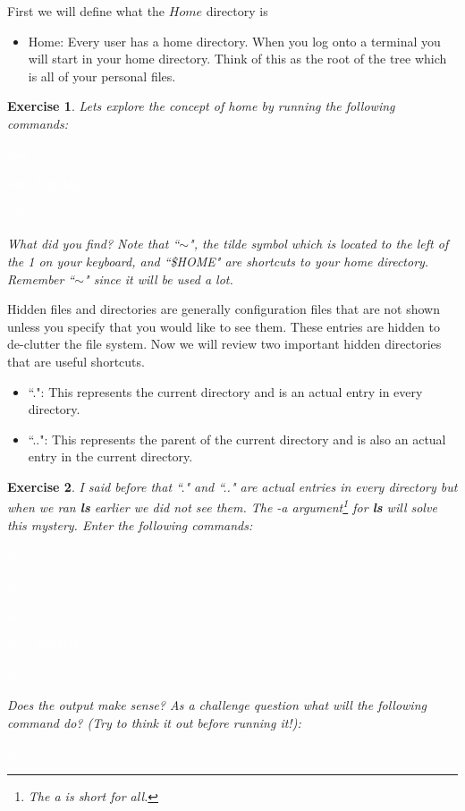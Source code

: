 \documentclass[oneside]{book}
\newcommand{\commandline}[1]{\begin{center} \colorbox{Dark}{\textcolor{white}{#1}} \end{center}}
\newtheorem{ex}{Exercise}[chapter]
\begin{document}
First we will define what the $Home$ directory is
\begin{itemize}
	\item Home: Every user has a home directory. When you log onto a terminal you will start in your home directory. Think of this as the root of the tree which is all of your personal files.
\end{itemize}

\begin{ex} 
	Lets explore the concept of home by running the following commands:
	\commandline{pwd}
	\commandline{echo \$HOME}
	\commandline{echo $\sim$ }
	What did you find? Note that ``$\sim$", the tilde symbol which is located to the left of the 1 on your keyboard, and ``\$HOME" are shortcuts to your home directory. Remember ``$\sim$" since it will be used a lot.
\end{ex}

Hidden files and directories are generally configuration files that are not shown unless you specify that you would like to see them. These entries are hidden to de-clutter the file system. Now we will review two important hidden directories that are useful shortcuts.

\begin{itemize}
	\item ``.": This represents the current directory and is an actual entry in every directory.
	\item ``..": This represents the parent of the current directory and is also an actual entry in the current directory.
\end{itemize}

\begin{ex}
	I said before that ``." and ``.." are actual entries in every directory but when we ran \textbf{ls} earlier we did not see them. The -a argument\footnote{The a is short for all.} for \textbf{ls} will solve this mystery. Enter the following commands:
	\commandline{ls -a}
	\commandline{ls -a .}
	\commandline{ls -a $\sim$}
	\commandline{ls -a \$HOME}
	\commandline{ls ..}
Does the output make sense? As a challenge question what will the following command do? (Try to think it out before running it!):
	\commandline{ls ././././}
\end{ex}
\end{document}
